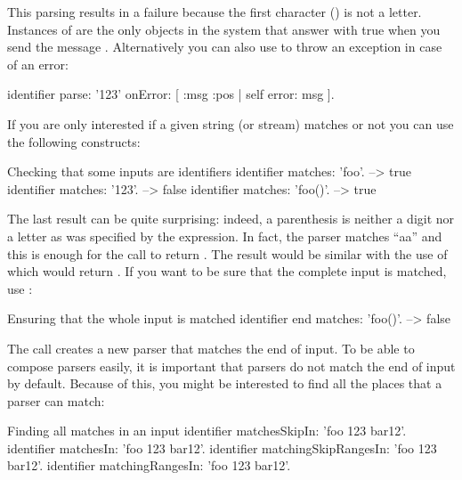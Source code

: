 \documentclass[a4paper,10pt,twoside]{book}
\begin{document}
This parsing results in a failure because the first character ()
is not a letter. Instances of  are the only objects in
the system that answer with true when you send the message
. Alternatively you can also use
 to throw an exception in case of an error:

\begin{code}{}
identifier
   parse: '123'
   onError: [ :msg :pos | self error: msg ].  
\end{code}

If you are only interested if a given string (or stream) matches or
not you can use the following constructs:

\begin{script}{Checking that some inputs are identifiers}
identifier matches: 'foo'.        --> true
identifier matches: '123'.        --> false
identifier matches: 'foo()'.      --> true
\end{script}

The last result can be quite surprising:%
indeed, a parenthesis is neither a digit nor a letter as was specified
by the  expression. In fact, the 
parser matches ``aa'' and this is enough for the  call to
return . The result would be similar with the use of
 which would return . %
If you want to be sure that the complete input is matched, use
:

\begin{script}{Ensuring that the whole input is matched}
identifier end matches: 'foo()'.   --> false
\end{script}

The  call creates a new parser that matches the end of input.
To be able to compose parsers easily, it is important that parsers do
not match the end of input by default. Because of this, you might be
interested to find all the places that a parser can match:

\begin{script}{Finding all matches in an input}
identifier matchesSkipIn: 'foo 123 bar12'.  
identifier matchesIn: 'foo 123 bar12'.  
identifier matchingSkipRangesIn: 'foo 123 bar12'.  
identifier matchingRangesIn: 'foo 123 bar12'.  
\end{script}
\end{document}
